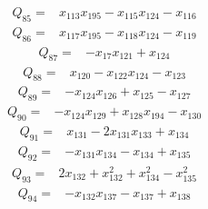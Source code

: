 \begin{equation*}\begin{split}
Q_{85}={}&x_{113} x_{195} - x_{115} x_{124} - x_{116}
\end{split}\end{equation*}
\begin{equation*}\begin{split}
Q_{86}={}&x_{117} x_{195} - x_{118} x_{124} - x_{119}
\end{split}\end{equation*}
\begin{equation*}\begin{split}
Q_{87}={}&-x_{17} x_{121} + x_{124}
\end{split}\end{equation*}
\begin{equation*}\begin{split}
Q_{88}={}&x_{120} - x_{122} x_{124} - x_{123}
\end{split}\end{equation*}
\begin{equation*}\begin{split}
Q_{89}={}&-x_{124} x_{126} + x_{125} - x_{127}
\end{split}\end{equation*}
\begin{equation*}\begin{split}
Q_{90}={}&-x_{124} x_{129} + x_{128} x_{194} - x_{130}
\end{split}\end{equation*}
\begin{equation*}\begin{split}
Q_{91}={}&x_{131} - 2x_{131} x_{133} + x_{134}
\end{split}\end{equation*}
\begin{equation*}\begin{split}
Q_{92}={}&-x_{131} x_{134} - x_{134} + x_{135}
\end{split}\end{equation*}
\begin{equation*}\begin{split}
Q_{93}={}&2x_{132} + x_{132}^{2} + x_{134}^{2} - x_{135}^{2}
\end{split}\end{equation*}
\begin{equation*}\begin{split}
Q_{94}={}&-x_{132} x_{137} - x_{137} + x_{138}
\end{split}\end{equation*}
